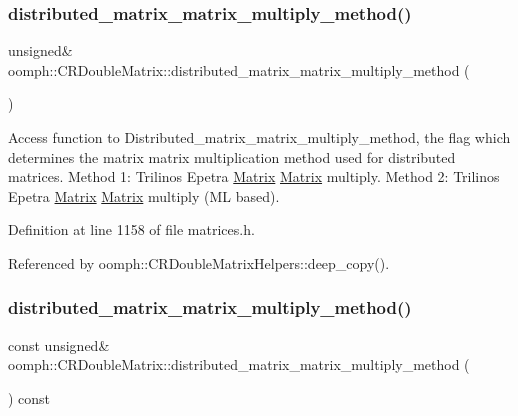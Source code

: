 \subsubsection{\texorpdfstring{distributed\+\_\+matrix\+\_\+matrix\+\_\+multiply\+\_\+method()}{distributed\_matrix\_matrix\_multiply\_method()}\hspace{0.1cm}{\footnotesize\ttfamily [1/2]}}
{\footnotesize\ttfamily unsigned\& oomph\+::\+C\+R\+Double\+Matrix\+::distributed\+\_\+matrix\+\_\+matrix\+\_\+multiply\+\_\+method (\begin{DoxyParamCaption}{ }\end{DoxyParamCaption})\hspace{0.3cm}{\ttfamily [inline]}}



Access function to Distributed\+\_\+matrix\+\_\+matrix\+\_\+multiply\+\_\+method, the flag which determines the matrix matrix multiplication method used for distributed matrices. Method 1\+: Trilinos Epetra \hyperlink{classoomph_1_1Matrix}{Matrix} \hyperlink{classoomph_1_1Matrix}{Matrix} multiply. Method 2\+: Trilinos Epetra \hyperlink{classoomph_1_1Matrix}{Matrix} \hyperlink{classoomph_1_1Matrix}{Matrix} multiply (ML based). 



Definition at line 1158 of file matrices.\+h.



Referenced by oomph\+::\+C\+R\+Double\+Matrix\+Helpers\+::deep\+\_\+copy().

\mbox{\label{classoomph_1_1CRDoubleMatrix_a61b0b02e40f94ddceecafe38626e7ad2}} 
\subsubsection{\texorpdfstring{distributed\+\_\+matrix\+\_\+matrix\+\_\+multiply\+\_\+method()}{distributed\_matrix\_matrix\_multiply\_method()}\hspace{0.1cm}{\footnotesize\ttfamily [2/2]}}
{\footnotesize\ttfamily const unsigned\& oomph\+::\+C\+R\+Double\+Matrix\+::distributed\+\_\+matrix\+\_\+matrix\+\_\+multiply\+\_\+method (\begin{DoxyParamCaption}{ }\end{DoxyParamCaption}) const\hspace{0.3cm}{\ttfamily [inline]}}



